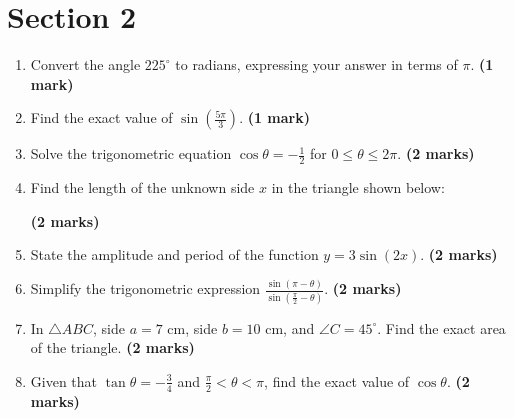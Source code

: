 \documentclass[11pt,a4paper]{article}
\begin{document}
\section*{Section 2}
\begin{enumerate}
    
    \item Convert the angle $225^\circ$ to radians, expressing your answer in terms of $\pi$. \hfill \textbf{(1 mark)}
    \vspace{0.5cm}

    \item Find the exact value of $\sin\left(\frac{5\pi}{3}\right)$. \hfill \textbf{(1 mark)}
    \vspace{0.5cm}

    \item Solve the trigonometric equation $\cos \theta = -\frac{1}{2}$ for $0 \le \theta \le 2\pi$. \hfill \textbf{(2 marks)}
    \vspace{0.5cm}

    \item Find the length of the unknown side $x$ in the triangle shown below:
    
     \hfill \textbf{(2 marks)}
    \vspace{0.5cm}

    \item State the amplitude and period of the function $y = 3\sin(2x)$. \hfill \textbf{(2 marks)}
    \vspace{0.5cm}

    \item Simplify the trigonometric expression $\frac{\sin(\pi - \theta)}{\sin(\frac{\pi}{2} - \theta)}$. \hfill \textbf{(2 marks)}
    \vspace{0.5cm}

    \item In $\triangle ABC$, side $a = 7\text{ cm}$, side $b = 10\text{ cm}$, and $\angle C = 45^\circ$. Find the exact area of the triangle. \hfill \textbf{(2 marks)}
    \vspace{0.5cm}

    \item Given that $\tan \theta = -\frac{3}{4}$ and $\frac{\pi}{2} < \theta < \pi$, find the exact value of $\cos \theta$. \hfill \textbf{(2 marks)}
    \vspace{0.5cm}


\end{enumerate}
\end{document}
